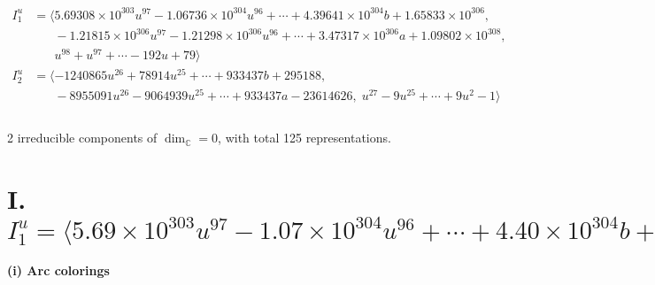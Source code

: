 \documentclass[1p]{elsarticle_modified}
\theoremstyle{definition}
\begin{document}
\begin{align*}
I^u_{1}&=\langle 
5.69308\times10^{303} u^{97}-1.06736\times10^{304} u^{96}+\cdots+4.39641\times10^{304} b+1.65833\times10^{306},\\
\phantom{I^u_{1}}&\phantom{= \langle  }-1.21815\times10^{306} u^{97}-1.21298\times10^{306} u^{96}+\cdots+3.47317\times10^{306} a+1.09802\times10^{308},\\
\phantom{I^u_{1}}&\phantom{= \langle  }u^{98}+u^{97}+\cdots-192 u+79\rangle \\
I^u_{2}&=\langle 
-1240865 u^{26}+78914 u^{25}+\cdots+933437 b+295188,\\
\phantom{I^u_{2}}&\phantom{= \langle  }-8955091 u^{26}-9064939 u^{25}+\cdots+933437 a-23614626,\;u^{27}-9 u^{25}+\cdots+9 u^2-1\rangle \\
\\
\end{align*}
\raggedright * 2 irreducible components of $\dim_{\mathbb{C}}=0$, with total 125 representations.\\
\newpage
\renewcommand{\arraystretch}{1}
\centering \section*{I. $I^u_{1}= \langle 5.69\times10^{303} u^{97}-1.07\times10^{304} u^{96}+\cdots+4.40\times10^{304} b+1.66\times10^{306},\;-1.22\times10^{306} u^{97}-1.21\times10^{306} u^{96}+\cdots+3.47\times10^{306} a+1.10\times10^{308},\;u^{98}+u^{97}+\cdots-192 u+79 \rangle$}
\flushleft \textbf{(i) Arc colorings}\\
\end{document}
